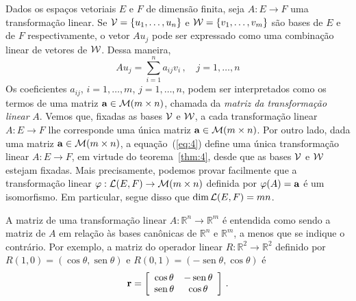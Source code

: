\documentclass[12pt,a4paper]{article}
\newcommand{\dsqr}[1]{\left[#1\right]}
\newcommand{\R}{\mathbb{R}}
\theoremstyle{definition}
\DeclareMathOperator{\sen}{sen}
\begin{document}
Dados os espaços vetoriais $E$ e $F$ de dimensão finita, seja
$A:E\to F$ uma transformação linear. Se ${\cal V}=\{u_1,\ldots,u_n\}$
e ${\cal W}=\{v_1,\ldots,v_m\}$ são bases de $E$ e de $F$
respectivamente, o vetor $Au_j$ pode ser expressado como uma
combinação linear de vetores de ${\cal W}$. Dessa maneira,
\begin{equation}
  \label{eq:4}
  Au_j=\sum_{i=1}^na_{ij}v_i\,,\quad j=1,\ldots,n
\end{equation}
Os coeficientes $a_{ij}$, $i=1,\ldots,m$, $j=1,\ldots,n$, podem ser
interpretados como os termos de uma matriz
${\bf a}\in{\cal M}(m\times n)$, chamada da \textit{matriz da
  transformação linear} $A$. Vemos que, fixadas as bases ${\cal V}$ e
${\cal W}$, a cada transformação linear $A:E\to F$ lhe corresponde uma
única matriz ${\bf a}\in {\cal M}(m\times n)$. Por outro lado, dada
uma matriz ${\bf a}\in{\cal M}(m\times n)$, a equação~(\ref{eq:4})
define uma única transformação linear $A:E\to F$, em virtude do
teorema~\ref{thm:4}, desde que as bases ${\cal V}$ e ${\cal W}$
estejam fixadas. Mais precisamente, podemos provar facilmente que a
transformação linear $\varphi:{\cal L}(E,F)\to{\cal M}(m\times n)$
definida por $\varphi(A)={\bf a}$ é um isomorfismo. Em particular,
segue disso que $\dim{\cal L}(E,F)=mn$.

A matriz de uma transformação linear $A:\R^n\to\R^m$ é entendida como
sendo a matriz de $A$ em relação às bases canônicas de $\R^n$ e
$\R^m$, a menos que se indique o contrário. Por exemplo, a matriz do
operador linear $R:\R^2\to\R^2$ definido por
$R(1,0)=(\cos\theta,\sen\theta)$ e $R(0,1)=(-\sen\theta,\cos\theta)$ é
$${\bf r}=\dsqr{
  \begin{array}{cc}
    \cos\theta&-\sen\theta\\
    \sen\theta&\cos\theta
  \end{array}
}\,.$$
\end{document}
